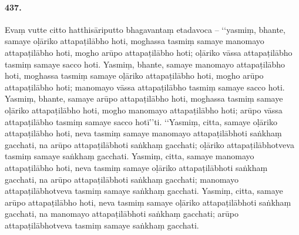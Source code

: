 \paragraph{437.} Evaṃ vutte citto hatthisāriputto bhagavantaṃ etadavoca – ‘‘yasmiṃ, bhante, samaye oḷāriko attapaṭilābho hoti, moghassa tasmiṃ samaye manomayo attapaṭilābho hoti, mogho arūpo attapaṭilābho hoti; oḷāriko vāssa attapaṭilābho tasmiṃ samaye sacco hoti. Yasmiṃ, bhante, samaye manomayo attapaṭilābho hoti, moghassa tasmiṃ samaye oḷāriko attapaṭilābho hoti, mogho arūpo attapaṭilābho hoti; manomayo vāssa attapaṭilābho tasmiṃ samaye sacco hoti. Yasmiṃ, bhante, samaye arūpo attapaṭilābho hoti, moghassa tasmiṃ samaye oḷāriko attapaṭilābho hoti, mogho manomayo attapaṭilābho hoti; arūpo vāssa attapaṭilābho tasmiṃ samaye sacco hotī’’ti. ‘‘Yasmiṃ, citta, samaye oḷāriko attapaṭilābho hoti, neva tasmiṃ samaye manomayo attapaṭilābhoti saṅkhaṃ gacchati, na arūpo attapaṭilābhoti saṅkhaṃ gacchati; oḷāriko attapaṭilābhotveva tasmiṃ samaye saṅkhaṃ gacchati. Yasmiṃ, citta, samaye manomayo attapaṭilābho hoti, neva tasmiṃ samaye oḷāriko attapaṭilābhoti saṅkhaṃ gacchati, na arūpo attapaṭilābhoti saṅkhaṃ gacchati; manomayo attapaṭilābhotveva tasmiṃ samaye saṅkhaṃ gacchati. Yasmiṃ, citta, samaye arūpo attapaṭilābho hoti, neva tasmiṃ samaye oḷāriko attapaṭilābhoti saṅkhaṃ gacchati, na manomayo attapaṭilābhoti saṅkhaṃ gacchati; arūpo attapaṭilābhotveva tasmiṃ samaye saṅkhaṃ gacchati.

